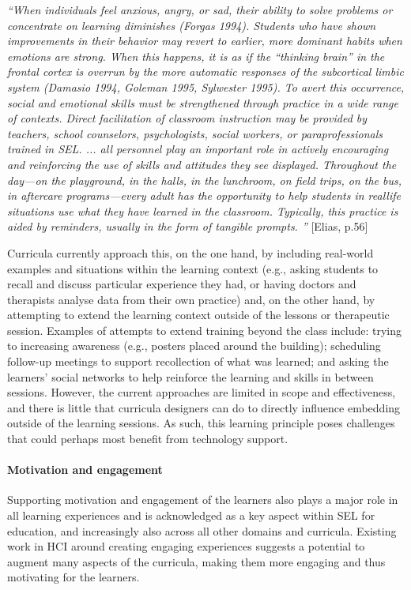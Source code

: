 \documentclass[prodmode,acmtochi]{acmsmall}
\newcommand{\GeraldineTODO}[1]{}
\newcommand{\qq}[2]{\textrm{\textit{``#2''}}{ [#1]}}
\begin{document}
\item \qq{Elias, p.56}{When individuals feel anxious, angry, or sad, their ability to solve problems or concentrate on learning diminishes (Forgas 1994). Students who have shown improvements in their behavior may revert to earlier, more dominant habits when emotions are strong. When this happens, it is as if the “thinking brain” in the frontal cortex is overrun by the more automatic responses of the subcortical limbic system (Damasio 1994, Goleman 1995, Sylwester 1995). To avert this occurrence, social and emotional skills must be strengthened through practice in a wide range of contexts. Direct facilitation of classroom instruction may be provided by teachers, school counselors, psychologists, social workers, or paraprofessionals trained in SEL. ...  all personnel play an important role in actively encouraging and reinforcing the use of skills and attitudes they see displayed. Throughout the day—on the playground, in the halls, in the lunchroom, on field trips, on the bus, in aftercare programs—every adult has the opportunity to help students in reallife situations use what they have learned in the classroom. Typically, this practice is aided by reminders, usually in the form of tangible prompts. }

        Curricula currently approach this, on the one hand, by including real-world examples and situations within the learning context (e.g., asking students to recall and discuss particular experience they had, or having doctors and therapists analyse data from their own practice) and, on the other hand, by attempting to extend the learning context outside of the lessons or therapeutic session. Examples of attempts to extend training beyond the class include: trying to increasing awareness (e.g., posters placed around the building); scheduling follow-up meetings to support recollection of what was learned; and asking the learners' social networks to help reinforce the learning and skills in between sessions.
        However, the current approaches are limited in scope and effectiveness, and there is little that curricula designers can do to directly influence embedding outside of the learning sessions. As such, this learning principle poses challenges that could perhaps most benefit from technology support. 

\paragraph{Motivation and engagement} Supporting motivation and engagement of the learners also plays a major role in all learning experiences and is acknowledged as a key aspect within SEL for education, and increasingly also across all other domains and curricula. Existing work in HCI around creating engaging experiences suggests a potential to augment many aspects of the curricula, making them more engaging and thus motivating for the learners.
\GeraldineTODO{G: breaks the pattern as previous aspects haven't really mentioned HCI work in this way - lose here and replace with how motivation is currently handled???} 
\end{document}
